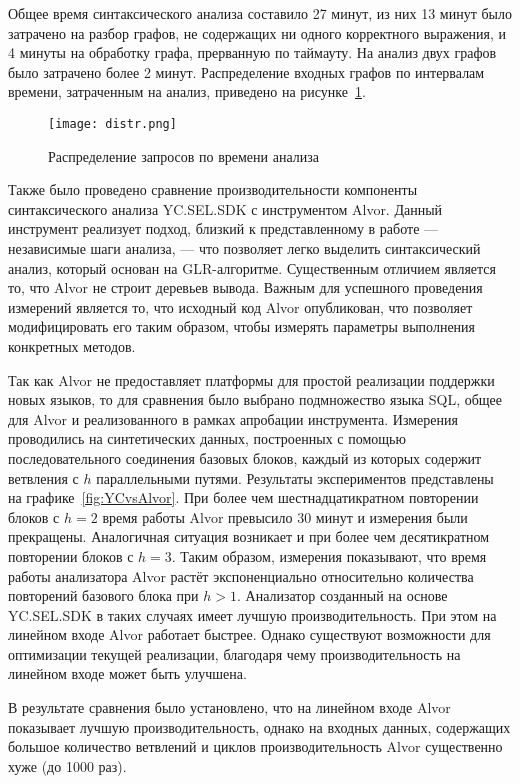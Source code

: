 Общее время синтаксического анализа составило 27 минут, из них 13 минут было затрачено на разбор графов, не содержащих ни одного корректного выражения, и 4 минуты на обработку графа, прерванную по таймауту. На анализ двух графов было затрачено более 2 минут. Распределение входных графов по интервалам времени, затраченным на анализ, приведено на рисунке~\ref{distr}.

\begin{figure}[]
  \centering
 \texttt{[image: distr.png]}
 \caption{Распределение запросов по времени анализа}
 \label{distr}
\end{figure}


Также было проведено сравнение производительности компоненты синтаксического анализа YC.SEL.SDK с инструментом Alvor. Данный инструмент реализует подход, близкий к представленному в работе --- независимые шаги анализа, --- что позволяет легко выделить синтаксический анализ, который основан на GLR-алгоритме. Существенным отличием является то, что Alvor не строит деревьев вывода. Важным для успешного проведения измерений является то, что исходный код Alvor опубликован, что позволяет модифицировать его таким образом, чтобы измерять параметры выполнения конкретных методов. 

Так как Alvor не предоставляет платформы для простой реализации поддержки новых языков, то для сравнения было выбрано подмножество языка SQL, общее для Alvor и реализованного в рамках апробации инструмента. 
Измерения проводились на синтетических данных, построенных с помощью последовательного соединения базовых блоков, каждый из которых содержит ветвления с $h$ параллельными путями. Результаты экспериментов 
представлены на графике~\ref{fig:YCvsAlvor}. При более чем шестнадцатикратном повторении блоков с $h=2$ время работы Alvor превысило 30 минут и измерения были прекращены. Аналогичная ситуация возникает и при 
более чем десятикратном повторении блоков с $h=3$. Таким образом, измерения показывают, что время работы анализатора Alvor растёт экспоненциально относительно количества повторений базового блока при $h>1$. 
Анализатор созданный на основе YC.SEL.SDK в таких случаях имеет лучшую производительность. При этом на линейном входе Alvor работает быстрее. Однако существуют возможности для оптимизации текущей реализации, благодаря чему производительность на линейном входе может быть улучшена.

В результате сравнения было установлено, что на линейном входе Alvor показывает лучшую производительность, однако на входных данных, содержащих большое количество ветвлений и циклов производительность Alvor существенно хуже (до 1000 раз).

